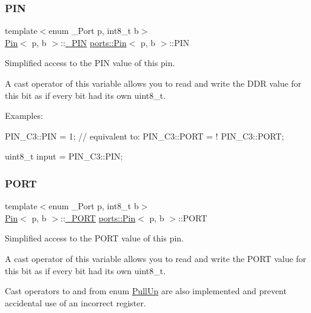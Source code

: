 \subsubsection{\texorpdfstring{P\+IN}{PIN}}
{\footnotesize\ttfamily template$<$enum \+\_\+\+Port p, int8\+\_\+t b$>$ \\
\hyperlink{structports_1_1Pin}{Pin}$<$ p, b $>$\+::\hyperlink{structports_1_1__Io}{\+\_\+\+P\+IN} \hyperlink{structports_1_1Pin}{ports\+::\+Pin}$<$ p, b $>$\+::P\+IN\hspace{0.3cm}{\ttfamily [static]}}



Simplified access to the P\+IN value of this pin. 

A cast operator of this variable allows you to read and write the D\+DR value for this bit as if every bit had its own uint8\+\_\+t.

Examples\+:


\begin{DoxyItemize}
\item {\ttfamily P\+I\+N\+\_\+\+C3\+::\+P\+IN = 1; // equivalent to\+: P\+I\+N\+\_\+\+C3\+::\+P\+O\+RT = ! P\+I\+N\+\_\+\+C3\+::\+P\+O\+RT;}
\item {\ttfamily uint8\+\_\+t input = P\+I\+N\+\_\+\+C3\+::\+P\+IN;} 
\end{DoxyItemize}\hypertarget{structports_1_1Pin_aaa08f0eb17ef31d9f46d65d50c8a093e}{}\label{structports_1_1Pin_aaa08f0eb17ef31d9f46d65d50c8a093e} 
\subsubsection{\texorpdfstring{P\+O\+RT}{PORT}}
{\footnotesize\ttfamily template$<$enum \+\_\+\+Port p, int8\+\_\+t b$>$ \\
\hyperlink{structports_1_1Pin}{Pin}$<$ p, b $>$\+::\hyperlink{structports_1_1__Io}{\+\_\+\+P\+O\+RT} \hyperlink{structports_1_1Pin}{ports\+::\+Pin}$<$ p, b $>$\+::P\+O\+RT\hspace{0.3cm}{\ttfamily [static]}}



Simplified access to the P\+O\+RT value of this pin. 

A cast operator of this variable allows you to read and write the P\+O\+RT value for this bit as if every bit had its own {\ttfamily uint8\+\_\+t}.

Cast operators to and from enum \hyperlink{namespaceports_a49bf0ccedb4cfed89a328574e53bec07}{Pull\+Up} are also implemented and prevent accidental use of an incorrect register.

